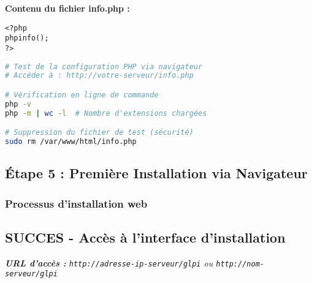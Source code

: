 \documentclass[12pt,a4paper]{article}
\newcommand{\successbox}[2]{\subsection{SUCCES - #1}\textit{#2}}
\begin{document}
\textbf{Contenu du fichier info.php :}
\begin{lstlisting}[caption=Fichier de test PHP]
<?php
phpinfo();
?>
\end{lstlisting}

\begin{lstlisting}[language=bash, caption=Test des extensions PHP]
# Test de la configuration PHP via navigateur
# Accéder à : http://votre-serveur/info.php

# Vérification en ligne de commande
php -v
php -m | wc -l  # Nombre d'extensions chargées

# Suppression du fichier de test (sécurité)
sudo rm /var/www/html/info.php
\end{lstlisting}

\subsection{Étape 5 : Première Installation via Navigateur}

\subsubsection{Processus d'installation web}
\successbox{Accès à l'interface d'installation}{
\textbf{URL d'accès :} \texttt{http://adresse-ip-serveur/glpi} ou \texttt{http://nom-serveur/glpi}
}
\end{document}
